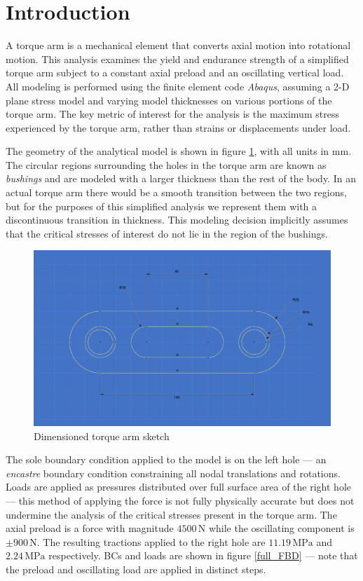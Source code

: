\documentclass[../main.tex]{subfiles}
\begin{document}
\section{Introduction}

A torque arm is a mechanical element that converts axial motion into rotational motion.
This analysis examines the yield and endurance strength of a simplified torque arm subject to a constant axial preload and an oscillating vertical load. 
All modeling is performed using the finite element code \textit{Abaqus}, assuming a 2-D plane stress model and varying model thicknesses on various portions of the torque arm.
The key metric of interest for the analysis is the maximum stress experienced by the torque arm, rather than strains or displacements under load.
 
The geometry of the analytical model is shown in figure \ref{dimensioned_sketch}, with all units in \(\unit{\milli\meter}\).
The circular regions surrounding the holes in the torque arm are known as \textit{bushings} and are modeled with a larger thickness than the rest of the body.
In an actual torque arm there would be a smooth transition between the two regions, but for the purposes of this simplified analysis we represent them with a discontinuous transition in thickness.
This modeling decision implicitly assumes that the critical stresses of interest do not lie in the region of the bushings.

\begin{figure}[h!]
    \centering
    \includegraphics[scale=0.6]{../../images/dimensions_colored.png}
    \caption{Dimensioned torque arm sketch}
    \label{dimensioned_sketch}
\end{figure}

The sole boundary condition applied to the model is on the left hole --- an \textit{encastre} boundary condition constraining all nodal translations and rotations.
Loads are applied as pressures distributed over full surface area of the right hole --- this method of applying the force is not fully physically accurate but does not undermine the analysis of the critical stresses present in the torque arm.
The axial preload is a force with magnitude \(4500\,\unit{\newton}\) while the oscillating component is \(\pm 900\,\unit{\newton}\).
The resulting tractions applied to the right hole are \(11.19\,\unit{\mega\pascal}\) and \(2.24\,\unit{\mega\pascal}\) respectively.
BCs and loads are shown in figure \ref{full_FBD} --- note that the preload and oscillating load are applied in distinct steps.
\end{document}
